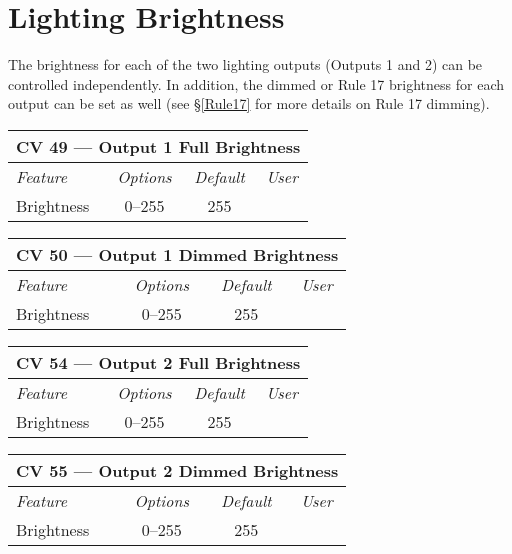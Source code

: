 \documentclass[12pt,letterpaper,draft]{memoir} %
\begin{document}
\section{Lighting Brightness}

The brightness for each of the two lighting outputs (Outputs 1 and 2) can be controlled independently. In addition, the dimmed or Rule 17 brightness for each output can be set as well (see \S\ref{Rule17} for more details on Rule 17 dimming).

\label{CV49}
\begin{center}
\begin{tabular}{|l|c|c|c|}
\hline
\multicolumn{4}{|c|}{\textbf{CV 49 --- Output 1 Full Brightness}} \\ \hline \hline
\textit{Feature} & \textit{Options} & \textit{Default} & \textit{User} \\ \hline
Brightness & 0--255 & 255 &\\ \hline
\end{tabular}
\end{center}

\label{CV50}
\begin{center}
\begin{tabular}{|l|c|c|c|}
\hline
\multicolumn{4}{|c|}{\textbf{CV 50 --- Output 1 Dimmed Brightness}} \\ \hline \hline
\textit{Feature} & \textit{Options} & \textit{Default} & \textit{User} \\ \hline
Brightness & 0--255 & 255 &\\ \hline
\end{tabular}
\end{center}

\label{CV54}
\begin{center}
\begin{tabular}{|l|c|c|c|}
\hline
\multicolumn{4}{|c|}{\textbf{CV 54 --- Output 2 Full Brightness}} \\ \hline \hline
\textit{Feature} & \textit{Options} & \textit{Default} & \textit{User} \\ \hline
Brightness & 0--255 & 255 &\\ \hline
\end{tabular}
\end{center}

\label{CV55}
\begin{center}
\begin{tabular}{|l|c|c|c|}
\hline
\multicolumn{4}{|c|}{\textbf{CV 55 --- Output 2 Dimmed Brightness}} \\ \hline \hline
\textit{Feature} & \textit{Options} & \textit{Default} & \textit{User} \\ \hline
Brightness & 0--255 & 255 &\\ \hline
\end{tabular}
\end{center}
\end{document}
